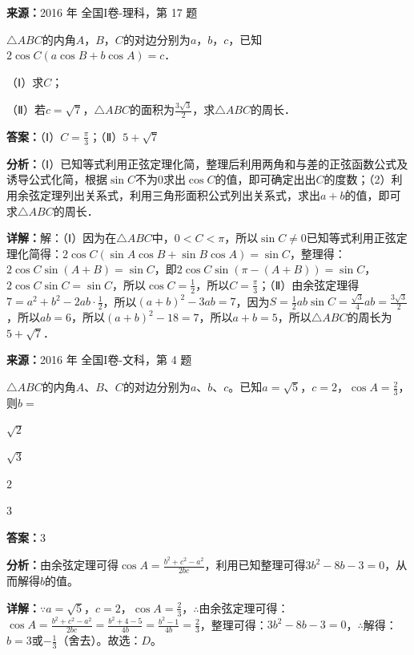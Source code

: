 \begin{question}[points=12]
\textbf{来源：}2016 年 全国I卷-理科，第 17 题\par
$\triangle ABC$的内角$A$，$B$，$C$的对边分别为$a$，$b$，$c$，已知$2\cos C(a\cos B+b\cos A)=c$．

（Ⅰ）求$C$；

（Ⅱ）若$c=\sqrt{7}$，$\triangle ABC$的面积为$\frac{3\sqrt{3}}{2}$，求$\triangle ABC$的周长．
\begin{solution}
\textbf{答案：}（Ⅰ）$C=\frac{\pi}{3}$；（Ⅱ）$5+\sqrt{7}$

\textbf{分析：}（Ⅰ）已知等式利用正弦定理化简，整理后利用两角和与差的正弦函数公式及诱导公式化简，根据$\sin C$不为$0$求出$\cos C$的值，即可确定出出$C$的度数；（2）利用余弦定理列出关系式，利用三角形面积公式列出关系式，求出$a+b$的值，即可求$\triangle ABC$的周长．

\textbf{详解：}解：（Ⅰ）因为在$\triangle ABC$中，$0<C<\pi$，所以$\sin C\neq0$已知等式利用正弦定理化简得：$2\cos C(\sin A\cos B+\sin B\cos A)=\sin C$，整理得：$2\cos C\sin(A+B)=\sin C$，即$2\cos C\sin(\pi-(A+B))=\sin C$，$2\cos C\sin C=\sin C$，所以$\cos C=\frac{1}{2}$，所以$C=\frac{\pi}{3}$；（Ⅱ）由余弦定理得$7=a^2+b^2-2ab\cdot\frac{1}{2}$，所以$(a+b)^2-3ab=7$，因为$S=\frac{1}{2}ab\sin C=\frac{\sqrt{3}}{4}ab=\frac{3\sqrt{3}}{2}$，所以$ab=6$，所以$(a+b)^2-18=7$，所以$a+b=5$，所以$\triangle ABC$的周长为$5+\sqrt{7}$．
\end{solution}
\end{question}

\begin{question}[points=5]
\textbf{来源：}2016 年 全国I卷-文科，第 4 题\par
$\triangle ABC$的内角$A$、$B$、$C$的对边分别为$a$、$b$、$c$。已知$a=\sqrt{5}$，$c=2$，$\cos A=\frac{2}{3}$，则$b=$
\begin{choices}
  \item $\sqrt{2}$
  \item $\sqrt{3}$
  \item $2$
  \item $3$
\end{choices}
\begin{solution}
\textbf{答案：}$3$

\textbf{分析：}由余弦定理可得$\cos A=\frac{b^2+c^2-a^2}{2bc}$，利用已知整理可得$3b^2-8b-3=0$，从而解得$b$的值。

\textbf{详解：}$\because a=\sqrt{5}$，$c=2$，$\cos A=\frac{2}{3}$，$\therefore$由余弦定理可得：$\cos A=\frac{b^2+c^2-a^2}{2bc}=\frac{b^2+4-5}{4b}=\frac{b^2-1}{4b}=\frac{2}{3}$，整理可得：$3b^2-8b-3=0$，$\therefore$解得：$b=3$或$-\frac{1}{3}$（舍去）。故选：$D$。
\end{solution}
\end{question}

